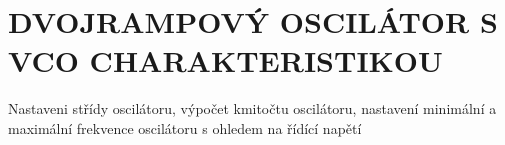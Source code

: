 \section{DVOJRAMPOVÝ OSCILÁTOR S VCO CHARAKTERISTIKOU}
Nastaveni střídy oscilátoru, výpočet kmitočtu oscilátoru, nastavení minimální a maximální frekvence oscilátoru s ohledem na řídící napětí

